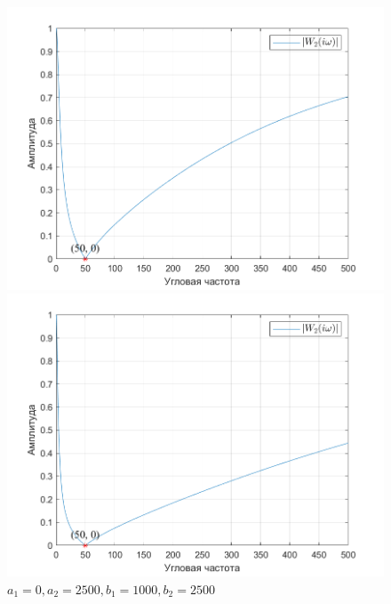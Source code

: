 \documentclass[a4paper]{article}
\begin{document}
\begin{figure}[H]
    \begin{minipage}{0.5\textwidth}
        \centering
        \includegraphics[width=\linewidth]{ex1_2/a1=0_a2=2500_b1=500_b2=2500_d=50/h1.png}
        \caption{$a_1=0, a_2=2500, b_1=500, b_2=2500$}
    \end{minipage}
    \begin{minipage}{0.5\textwidth}
        \centering
        \includegraphics[width=\linewidth]{ex1_2/a1=0_a2=2500_b1=1000_b2=2500_d=50/h1.png}
        \caption{$a_1=0, a_2=2500, b_1=1000, b_2=2500$}
    \end{minipage}
\end{figure}
\end{document}
